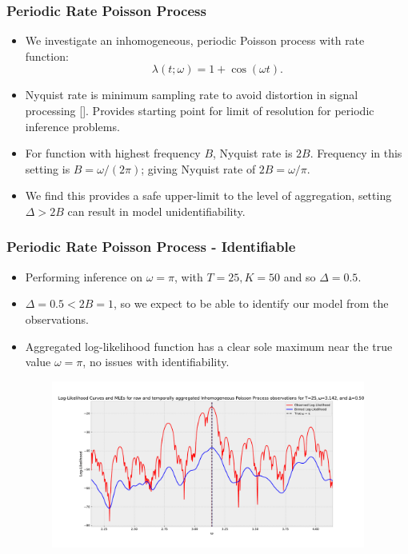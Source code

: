\documentclass[11pt]{beamer}
\begin{document}
\begin{frame}
	\frametitle{Periodic Rate Poisson Process}
	\begin{itemize}
		\item We investigate an inhomogeneous, periodic Poisson process with rate function:
		\begin{equation*}
			\lambda(t; \omega) = 1 + \cos(\omega t).
		\end{equation*}
		\item Nyquist rate is minimum sampling rate to avoid distortion in signal processing [\cite{nyquist}]. Provides starting point for limit of resolution for periodic inference problems.
		\item For function with highest frequency $B$, Nyquist rate is $2B$. Frequency in this setting is $B = \omega / (2 \pi)$; giving Nyquist rate of $2B = \omega / \pi$.
		\item We find this provides a safe upper-limit to the level of aggregation, setting $\Delta > 2B$ can result in model unidentifiability.
	\end{itemize}
\end{frame}

\begin{frame}
	\frametitle{Periodic Rate Poisson Process - Identifiable}
	\begin{itemize}
		\item Performing inference on $\omega= \pi$, with $T=25, K=50$ and so $\Delta=0.5$.
		\item $\Delta = 0.5 < 2B = 1$, so we expect to be able to identify our model from the observations.
		\item Aggregated log-likelihood function has a clear sole maximum near the true value $\omega=\pi$, no issues with identifiability.
	\end{itemize}
	\begin{figure}[!h]
		\includegraphics[height=5.5cm, width=12cm]{nhpp_periodic_id_log_likeli.pdf}
	\end{figure}
\end{frame}
\end{document}
